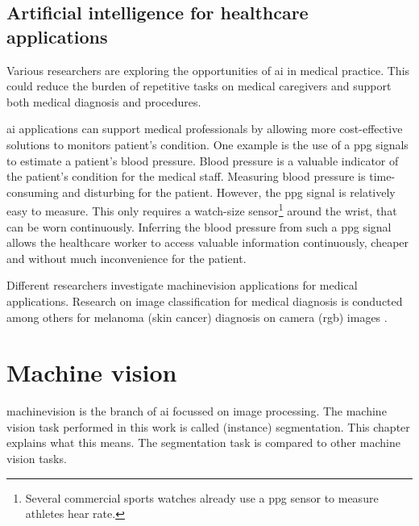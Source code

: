 \subsection{Artificial intelligence for healthcare applications}
\par{
    Various researchers are exploring the opportunities of \Gls{ai} in medical practice.
    This could reduce the burden of repetitive tasks on medical caregivers and support both medical diagnosis and procedures.
}
\par{
    \Gls{ai} applications can support medical professionals by allowing more cost-effective solutions to monitors patient's condition.
    One example is the use of a \acrfull{ppg} signals to estimate a patient's blood pressure.
    Blood pressure is a valuable indicator of the patient's condition for the medical staff.
    Measuring blood pressure is time-consuming and disturbing for the patient. 
    However, the \acrshort{ppg} signal is relatively easy to measure. This only requires a watch-size sensor\footnote{Several commercial sports watches already use a \acrshort{ppg} sensor to measure athletes hear rate.} 
    around the wrist, that can be worn continuously.
    Inferring the blood pressure from such a \acrshort{ppg} signal\cite{Khalid2018} allows the healthcare worker to access valuable information continuously, cheaper and without much inconvenience for the patient.
}
\par{
    Different researchers investigate \Gls{machinevision} applications for medical applications. 
    Research on image classification for medical diagnosis is conducted among others for melanoma (skin cancer) diagnosis on camera (\acrshort{rgb}) images \cite{Vocaturo2019}.
}
\section{Machine vision}
\par{
    \Gls{machinevision} is the branch of \Gls{ai} focussed on image processing.
    The machine vision task performed in this work is called (instance) \Gls{segmentation}.
    This chapter explains what this means. 
    The segmentation task is compared to other machine vision tasks.
}

